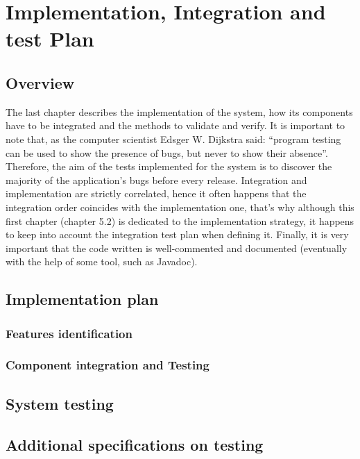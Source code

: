 \chapter{Implementation, Integration and test Plan}
\section{Overview}
The last chapter describes the implementation of the system, how its components have to be
integrated and the methods to validate and verify. It is important to note that, as the
computer scientist Edsger W. Dijkstra said: “program testing can be used to show the
presence of bugs, but never to show their absence”. Therefore, the aim of the tests
implemented for the system is to discover the majority of the application’s bugs before every
release. Integration and implementation are strictly correlated, hence it often happens that
the integration order coincides with the implementation one, that’s why although this first
chapter (chapter 5.2) is dedicated to the implementation strategy, it happens to keep into
account the integration test plan when defining it. Finally, it is very important that the code
written is well-commented and documented (eventually with the help of some tool, such as
Javadoc).
\section{Implementation plan}
\subsection{Features identification}
\subsection{Component integration and Testing}
\section{System testing}
\section{Additional specifications on testing}